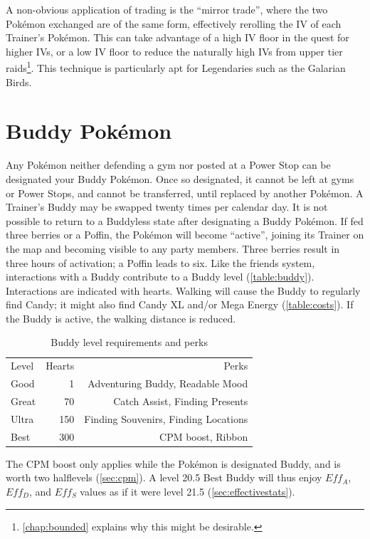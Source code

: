 A non-obvious application of trading is the ``mirror trade'', where the
 two Pokémon exchanged are of the same form, effectively rerolling the IV of each Trainer's Pokémon.
This can take advantage of a high IV floor in the quest for higher IVs, or
 a low IV floor to reduce the naturally high IVs from upper tier raids\footnote{\autoref{chap:bounded} explains why this might be desirable.}.
This technique is particularly apt for Legendaries such as the Galarian Birds.

\section{Buddy Pokémon\label{sec:buddies}}
Any Pokémon neither defending a gym nor posted at a Power Stop can be designated your Buddy Pokémon.
Once so designated, it cannot be left at gyms or Power Stops, and cannot be transferred,
  until replaced by another Pokémon.
A Trainer's Buddy may be swapped twenty times per calendar day.
It is not possible to return to a Buddyless state after designating a Buddy Pokémon.
If fed three berries or a Poffin, the Pokémon will become ``active'',
  joining its Trainer on the map and becoming visible to any party members.
Three berries result in three hours of activation; a Poffin leads to six.
Like the friends system, interactions with a Buddy contribute to a Buddy level (\autoref{table:buddy}).
Interactions are indicated with hearts.
Walking will cause the Buddy to regularly find Candy; it might also find Candy XL
  and/or Mega Energy (\autoref{table:costs}).
If the Buddy is active, the walking distance is reduced.
\begin{table}
\centering
\begin{tabular}{lrr}
Level & Hearts & Perks\\
\Midrule
Good & 1 & Adventuring Buddy, Readable Mood\\
Great & 70 & Catch Assist, Finding Presents\\
Ultra & 150 & Finding Souvenirs, Finding Locations\\
Best & 300 & CPM boost, Ribbon\\
\end{tabular}
  \caption{Buddy level requirements and perks\label{table:buddy}}
\end{table}
The CPM boost only applies while the Pokémon is designated Buddy,
  and is worth two halflevels (\autoref{sec:cpm}).
A level 20.5 Best Buddy will thus enjoy $Eff_A$, $Eff_D$, and $Eff_S$ values
  as if it were level 21.5 (\autoref{sec:effectivestats}).
